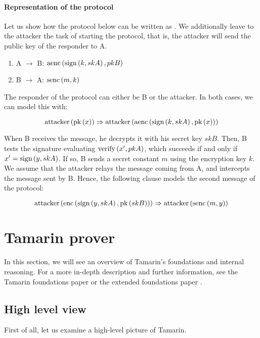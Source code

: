 \paragraph{Representation of the protocol}

Let us show how the protocol below can be written as \Horncs{}. We additionally leave to the attacker the task of starting the protocol, that is, the attacker will send the public key of the responder to A.

\begin{enumerate}
  \label{enum:protocol}
  \item A $\rightarrow$ B: $\mbox{aenc}\left(\mbox{sign}\left(k, skA\right), pkB\right)$
  \item B $\rightarrow$ A: $\mbox{senc}\left(m, k\right)$
\end{enumerate}

The responder of the protocol can either be B or the attacker. In both cases, we can model this with:

\begin{equation}
  \mbox{attacker}\left(\mbox{pk}\left(x\right)\right) \Rightarrow \mbox{attacker}\left(\mbox{aenc}\left(\mbox{sign}\left(k, skA\right), \mbox{pk}\left(x\right)\right)\right)
\end{equation}

When B receives the message, he decrypts it with his secret key $skB$. Then, B tests the signature evaluating $\mbox{verify}\left(x', pkA\right)$, which succeeds if and only if $x' = \mbox{sign}\left(y, skA\right)$. If so, B sends a secret constant $m$ using the encryption key $k$. We assume that the attacker relays the message coming from A, and intercepts the message sent by B. Hence, the following clause models the second message of the protocol:

\begin{equation}
  \mbox{attacker}\left(\mbox{enc}\left(\mbox{sign}\left(y, skA\right), \mbox{pk}\left(skB\right)\right)\right) \Rightarrow \mbox{attacker}\left(\mbox{senc}\left(m, y\right)\right)
\end{equation}






\section{Tamarin prover}
\label{sec:tamarin-foundations}
In this section, we will see an overview of Tamarin's foundations and internal reasoning.
For a more in-depth description and further information, see the Tamarin foundations paper \cite{TamarinFoundations} or the extended foundations paper \cite{TamarinFoundationsExtended}.

\subsection{High level view}
First of all, let us examine a high-level picture of Tamarin.

